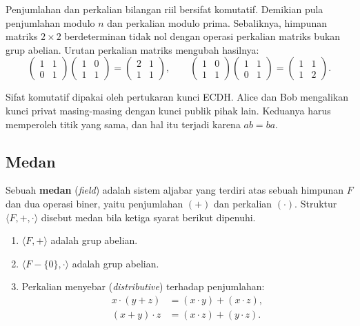 Penjumlahan dan perkalian bilangan riil bersifat komutatif. Demikian pula
penjumlahan modulo $n$ dan perkalian modulo prima. Sebaliknya, himpunan matriks
$2 \times 2$ berdeterminan tidak nol dengan operasi perkalian matriks bukan
grup abelian. Urutan perkalian matriks mengubah hasilnya:
\[
\begin{pmatrix} 1 & 1 \\ 0 & 1 \end{pmatrix}
\begin{pmatrix} 1 & 0 \\ 1 & 1 \end{pmatrix}
=
\begin{pmatrix} 2 & 1 \\ 1 & 1 \end{pmatrix},
\qquad
\begin{pmatrix} 1 & 0 \\ 1 & 1 \end{pmatrix}
\begin{pmatrix} 1 & 1 \\ 0 & 1 \end{pmatrix}
=
\begin{pmatrix} 1 & 1 \\ 1 & 2 \end{pmatrix}.
\]

Sifat komutatif dipakai oleh pertukaran kunci ECDH. Alice dan Bob mengalikan
kunci privat masing-masing dengan kunci publik pihak lain. Keduanya harus
memperoleh titik yang sama, dan hal itu terjadi karena $ab = ba$.

\subsection{Medan}
\label{subsec:medan}

Sebuah \textbf{medan} (\textit{field}) adalah sistem aljabar yang terdiri atas
sebuah himpunan $F$ dan dua operasi biner, yaitu penjumlahan $(+)$ dan
perkalian $(\cdot)$. Struktur $\langle F, +, \cdot \rangle$ disebut medan bila
ketiga syarat berikut dipenuhi.

\begin{enumerate}
    \item $\langle F, + \rangle$ adalah grup abelian.
    \item $\langle F - \{0\}, \cdot \rangle$ adalah grup abelian.
    \item Perkalian menyebar (\textit{distributive}) terhadap penjumlahan:
          \[
          \begin{aligned}
          x \cdot (y + z) &= (x \cdot y) + (x \cdot z), \\
          (x + y) \cdot z &= (x \cdot z) + (y \cdot z) .
          \end{aligned}
          \]
\end{enumerate}

